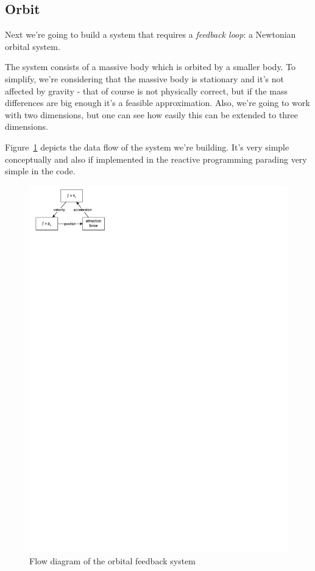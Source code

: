 \documentclass[notitlepage]{article}
\begin{document}
\subsection{Orbit}

Next we're going to build a system that requires a \textit{feedback loop}: a
Newtonian orbital system.

The system consists of a massive body which is orbited by a smaller body. To
simplify, we're considering that the massive body is stationary and it's not
affected by gravity - that of course is not physically correct, but if the mass
differences are big enough it's a feasible approximation. Also, we're going to
work with two dimensions, but one can see how easily this can be extended to
three dimensions.

Figure~\ref{fig:orbit} depicts the data flow of the system we're building. It's
very simple conceptually and also \- if implemented in the reactive programming
parading \- very simple in the code.

\begin{figure}
    \centering
    \includegraphics[width=0.8\linewidth,bb=0 0 133 82]{images/orbit.pdf}
    \caption{Flow diagram of the orbital feedback system}
    \label{fig:orbit}
\end{figure}
\end{document}
